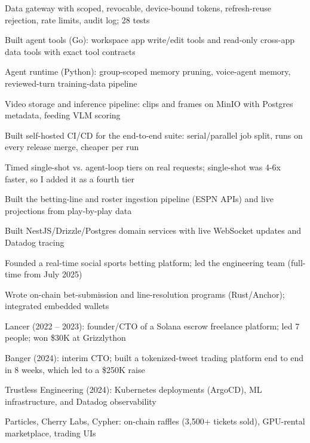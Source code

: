 \documentclass[print]{jack-resume}
\begin{document}
\begin{tightemize}
    \item Data gateway with scoped, revocable, device-bound tokens, refresh-reuse rejection, rate limits, audit log; 28 tests
    \item Built agent tools (Go): workspace app write/edit tools and read-only cross-app data tools with exact tool contracts
    \item Agent runtime (Python): group-scoped memory pruning, voice-agent memory, reviewed-turn training-data pipeline
    \item Video storage and inference pipeline: clips and frames on MinIO with Postgres metadata, feeding VLM scoring
    \item Built self-hosted CI/CD for the end-to-end suite: serial/parallel job split, runs on every release merge, cheaper per run
    \item Timed single-shot vs. agent-loop tiers on real requests; single-shot was 4-6x faster, so I added it as a fourth tier
\end{tightemize}
\sectionsep

\begin{tightemize}
    \item Built the betting-line and roster ingestion pipeline (ESPN APIs) and live projections from play-by-play data
    \item Built NestJS/Drizzle/Postgres domain services with live WebSocket updates and Datadog tracing
    \item Founded a real-time social sports betting platform; led the engineering team (full-time from July 2025)
    \item Wrote on-chain bet-submission and line-resolution programs (Rust/Anchor); integrated embedded wallets
\end{tightemize}
\sectionsep

\begin{tightemize}
    \item Lancer (2022 – 2023): founder/CTO of a Solana escrow freelance platform; led 7 people; won \$30K at Grizzlython
    \item Banger (2024): interim CTO; built a tokenized-tweet trading platform end to end in 8 weeks, which led to a \$250K raise
    \item Trustless Engineering (2024): Kubernetes deployments (ArgoCD), ML infrastructure, and Datadog observability
    \item Particles, Cherry Labs, Cypher: on-chain raffles (3,500+ tickets sold), GPU-rental marketplace, trading UIs
\end{tightemize}
\sectionsep
\end{document}
